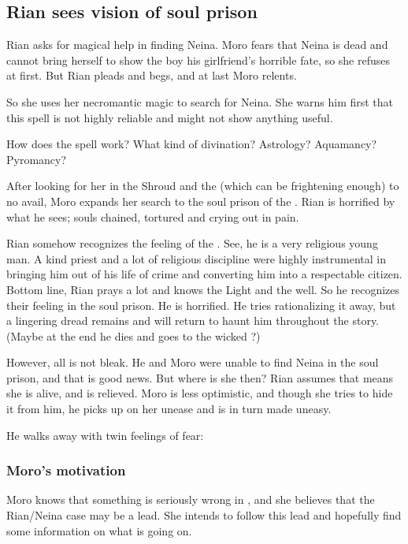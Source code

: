 \subsection{Rian sees vision of soul prison}
Rian asks \MoroCobrel{} for magical help in finding Neina. Moro fears that Neina is dead and cannot bring herself to show the boy his girlfriend's horrible fate, so she refuses at first. But Rian pleads and begs, and at last Moro relents. 

So she uses her necromantic magic to search for Neina. She warns him first that this spell is not highly reliable and might not show anything useful. 

How does the spell work? What kind of divination? Astrology? Aquamancy? Pyromancy? 

After looking for her in the Shroud and the \Wylde{} (which can be frightening enough) to no avail, Moro expands her search to the soul prison of the \Sephiroth{}. Rian is horrified by what he sees; souls chained, tortured and crying out in pain. 

Rian somehow recognizes the feeling of the \Sephiroth. See, he is a very religious young man. A kind priest and a lot of religious discipline were highly instrumental in bringing him out of his life of crime and converting him into a respectable citizen. Bottom line, Rian prays a lot and knows the Light and the \Sephiroth{} well. So he recognizes their feeling in the soul prison. He is horrified. He tries rationalizing it away, but a lingering dread remains and will return to haunt him throughout the story. (Maybe at the end he dies and goes to the wicked \Sephiroth?) 

However, all is not bleak. He and Moro were unable to find Neina in the soul prison, and that is good news. But where is she then? Rian assumes that means she is alive, and is relieved. Moro is less optimistic, and though she tries to hide it from him, he picks up on her unease and is in turn made uneasy. 

He walks away with twin feelings of fear: 







\subsubsection{Moro's motivation}
Moro knows that something is seriously wrong in \Malcur, and she believes that the Rian/Neina case may be a lead. 
She intends to follow this lead and hopefully find some information on what is going on. 

